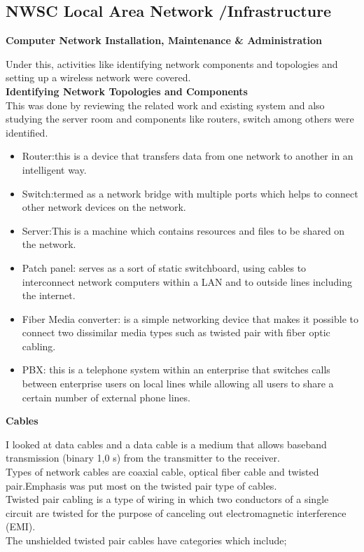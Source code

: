 \documentclass{article}
\begin{document}
\subsection{NWSC Local Area Network /Infrastructure}
\textbf{Computer Network Installation, Maintenance \& Administration}
\par Under this, activities like identifying network components and topologies and setting up a wireless network were covered.\\
\textbf{Identifying Network Topologies and Components}\\
This was done by reviewing the related work and existing system and also studying the server room and components like routers, switch among others were identified.
\begin{itemize}
\item Router:this is a device that transfers data from one network to another in an intelligent way.
\item Switch:termed as a network bridge with multiple ports which helps to connect other network devices on the network.
\item Server:This is a machine which contains resources and files to be shared on the network.
\item Patch panel: serves as a sort of static switchboard, using cables to interconnect network computers within a LAN and to outside lines including the internet.
\item Fiber Media converter:  is a simple networking device that makes it possible to connect two dissimilar media types such as twisted pair with fiber optic cabling.
\item PBX: this is a telephone system within an enterprise that switches calls between enterprise users on local lines while allowing all users to share a certain number of external phone lines.
\end{itemize}
\textbf{Cables}
\par I looked at data cables and a data cable is a medium that allows baseband transmission (binary 1,0 s) from the transmitter to the receiver.\\
Types of network cables are coaxial cable, optical fiber cable and twisted pair.Emphasis was put most on the twisted pair type of cables.\\
Twisted pair cabling is a type of wiring in which two conductors of a single circuit are twisted for the purpose of canceling out electromagnetic interference (EMI).\\
The unshielded twisted pair cables have categories which include;
\end{document}

